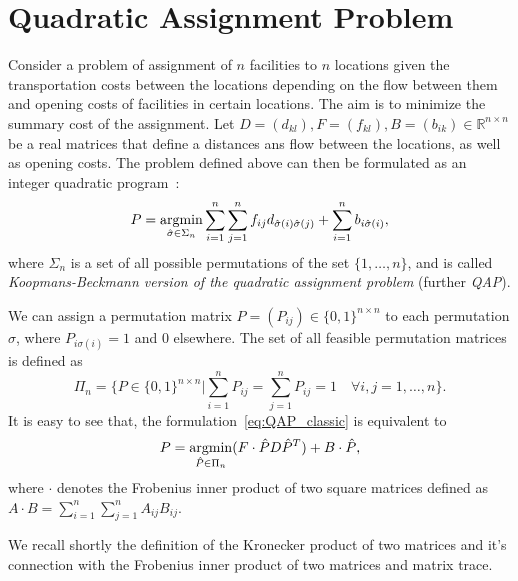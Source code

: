 \chapter{Quadratic Assignment Problem}
Consider a problem of assignment of $n$ facilities to $n$ locations given the transportation costs between the locations depending on the flow between them and opening costs of facilities in certain locations. The aim is to minimize the summary cost of the assignment. Let $D=(d_{kl}),F=(f_{kl}), B=(b_{ik})\in\mathbb{R}^{n\times n}$ be a real matrices that define a distances ans flow between the locations, as well as opening costs. The problem defined above can then be formulated as an integer quadratic program~\cite{Burkard98thequadratic,Koopman_Backman}:
\begin{equation}\label{eq:QAP_classic}
P = \mathop{\rm argmin}_{\hat{\sigma}\in\Sigma_n}\sum_{i=1}^{n}\sum_{j=1}^{n}f_{ij}d_{\hat{\sigma}(i)\hat{\sigma}(j)}+\sum_{i=1}^{n}b_{i\hat{\sigma}(i)},
\end{equation}
where $\Sigma_n$ is a set of all possible permutations of the set $\{1,\dots,n\}$, and is called \emph{Koopmans-Beckmann version of the quadratic assignment problem} (further \emph{QAP}). %


We can assign a permutation matrix $P=(P_{ij})\in\{0,1\}^{n\times n}$ to each permutation $\sigma$, where $P_{i\sigma(i)}=1$ and $0$ elsewhere. The set of all feasible permutation matrices is defined as
\begin{equation*}
\Pi_n=\{P\in\{0,1\}^{n\times n}|\sum_{i=1}^{n}P_{ij}=\sum_{j=1}^{n}P_{ij}=1\quad\forall i,j=1,\dots,n\}.
\end{equation*}
It is easy to see that, the formulation~\eqref{eq:QAP_classic} %
is equivalent to
\begin{equation}\label{eq:QAP_classic2}
P = \mathop{\rm argmin}_{\hat{P}\in\Pi_n}(F\cdot \hat{P}D\hat{P}^T)+B\cdot\hat{P},
\end{equation}
where $\cdot$ denotes the Frobenius inner product of two square matrices defined as $A\cdot B=\sum_{i=1}^{n}\sum_{j=1}^{n}A_{ij}B_{ij}$.

We recall shortly the definition of the Kronecker product of two matrices and it's connection with the Frobenius inner product of two matrices and matrix trace.

